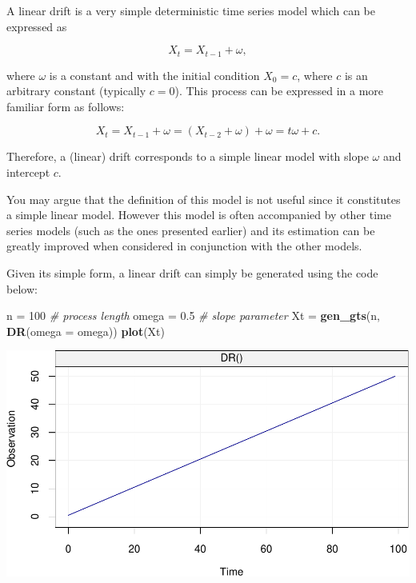 \documentclass[]{book}
\newenvironment{Shaded}{\begin{snugshade}}{\end{snugshade}}
\newcommand{\CommentTok}[1]{\textcolor[rgb]{0.56,0.35,0.01}{\textit{#1}}}
\newcommand{\DataTypeTok}[1]{\textcolor[rgb]{0.13,0.29,0.53}{#1}}
\newcommand{\DecValTok}[1]{\textcolor[rgb]{0.00,0.00,0.81}{#1}}
\newcommand{\FloatTok}[1]{\textcolor[rgb]{0.00,0.00,0.81}{#1}}
\newcommand{\KeywordTok}[1]{\textcolor[rgb]{0.13,0.29,0.53}{\textbf{#1}}}
\newcommand{\NormalTok}[1]{#1}
\newcommand{\StringTok}[1]{\textcolor[rgb]{0.31,0.60,0.02}{#1}}
\theoremstyle{definition}
\theoremstyle{definition}
\theoremstyle{definition}
\theoremstyle{remark}
\let\BeginKnitrBlock\begin \let\EndKnitrBlock\end
\begin{document}
A linear drift is a very simple deterministic time series model which
can be expressed as

\[X_t = X_{t-1} + \omega, \]

where \(\omega\) is a constant and with the initial condition
\(X_0 = c\), where \(c\) is an arbitrary constant (typically \(c = 0\)).
This process can be expressed in a more familiar form as follows:

\[
  {X_t} = {X_{t - 1}} + \omega 
   = \left( {{X_{t - 2}} + \omega} \right) + \omega 
   = t{\omega} + c . \]

Therefore, a (linear) drift corresponds to a simple linear model with
slope \(\omega\) and intercept \(c\).

\BeginKnitrBlock{exercise}
\protect\hypertarget{exr:remdrift}{}{\label{exr:remdrift} }You may argue
that the definition of this model is not useful since it constitutes a
simple linear model. However this model is often accompanied by other
time series models (such as the ones presented earlier) and its
estimation can be greatly improved when considered in conjunction with
the other models.
\EndKnitrBlock{exercise}

Given its simple form, a linear drift can simply be generated using the
code below:

\begin{Shaded}
\begin{Highlighting}[]
\NormalTok{n =}\StringTok{ }\DecValTok{100}                               \CommentTok{# process length}
\NormalTok{omega =}\StringTok{ }\FloatTok{0.5}                           \CommentTok{# slope parameter}
\NormalTok{Xt =}\StringTok{ }\KeywordTok{gen_gts}\NormalTok{(n, }\KeywordTok{DR}\NormalTok{(}\DataTypeTok{omega =}\NormalTok{ omega))}
\KeywordTok{plot}\NormalTok{(Xt)}
\end{Highlighting}
\end{Shaded}

\includegraphics{ts_files/figure-latex/example_Drift-1.pdf}
\end{document}
